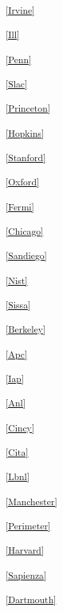 \clearpage

\begin{multicols}{2}

\scriptsize

\parskip=4pt

\noindent
\textsuperscript{\ref{Irvine}}\Irvinetext

\noindent
\textsuperscript{\ref{Ill}}\Illtext

\noindent
\textsuperscript{\ref{Penn}}\Penntext

\noindent
\textsuperscript{\ref{Slac}}\Slactext

\noindent
\textsuperscript{\ref{Princeton}}\Princetontext

\noindent
\textsuperscript{\ref{Hopkins}}\Hopkinstext

\noindent
\textsuperscript{\ref{Stanford}}\Stanfordtext

\noindent
\textsuperscript{\ref{Oxford}}\Oxfordtext

\noindent
\textsuperscript{\ref{Fermi}}\Fermitext

\noindent
\textsuperscript{\ref{Chicago}}\Chicagotext

\noindent
\textsuperscript{\ref{Sandiego}}\Sandiegotext

\noindent
\textsuperscript{\ref{Nist}}\Nisttext

\noindent
\textsuperscript{\ref{Sissa}}\Sissatext

\noindent
\textsuperscript{\ref{Berkeley}}\Berkeleytext

\noindent
\textsuperscript{\ref{Apc}}\Apctext

\noindent
\textsuperscript{\ref{Iap}}\Iaptext

\noindent
\textsuperscript{\ref{Anl}}\Anltext

\noindent
\textsuperscript{\ref{Cincy}}\Cincytext

\noindent
\textsuperscript{\ref{Cita}}\Citatext

\noindent
\textsuperscript{\ref{Lbnl}}\Lbnltext

\noindent
\textsuperscript{\ref{Manchester}}\Manchestertext

\noindent
\textsuperscript{\ref{Perimeter}}\Perimetertext

\noindent
\textsuperscript{\ref{Harvard}}\Harvardtext

\noindent
\textsuperscript{\ref{Sapienza}}\Sapienzatext

\noindent
\textsuperscript{\ref{Dartmouth}}\Dartmouthtext


\end{multicols}
